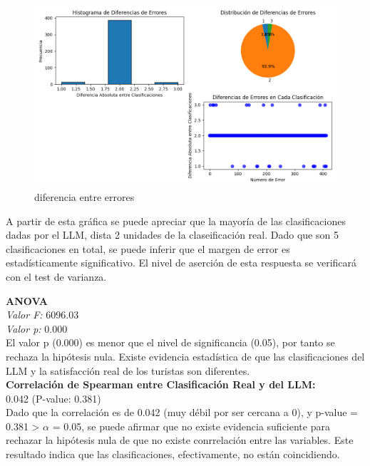 \documentclass[12pt,a4paper]{article} \usepackage[spanish]{babel} \usepackage{graphicx} \usepackage{amsmath} \usepackage{amsfonts} \usepackage{amssymb} \usepackage{float} \usepackage{geometry}
\begin{document}
\begin{figure}[H] \centering \includegraphics[width=\textwidth]{Diferencia de errores} \caption{diferencia entre errores} \label{fig:etiqueta}\end{figure}
A partir de esta gráfica se puede apreciar que la mayoría de las clasificaciones dadas por el LLM, dista 2 unidades de la claseificación real. Dado que son 5 clasificaciones en total, se puede inferir que el margen de error es estadísticamente significativo. El nivel de aserción de esta respuesta se verificará con el test de varianza.

\textbf{ANOVA}\\
\textit{Valor F:} 6096.03\\
\textit{Valor p:} 0.000\\
El valor p (0.000) es menor que el nivel de significancia (0.05), por tanto se rechaza la hipótesis nula. Existe evidencia estadística de que las clasificaciones del LLM y la satisfacción real de los turistas son diferentes.\\

\textbf{Correlación de Spearman entre Clasificación Real y del LLM:}\\
 0.042 (P-value: 0.381)\\
 Dado que la correlación es de 0.042 (muy débil por ser cercana a 0), y p-value = 0.381 > $\alpha$ = 0.05, se puede afirmar que no existe evidencia suficiente para rechazar la hipótesis nula de que no existe conrrelación entre las variables. Este resultado indica que las clasificaciones, efectivamente, no están coincidiendo.
\end{document}
